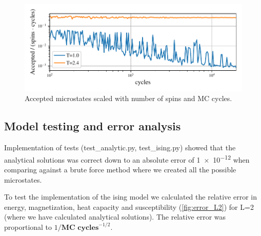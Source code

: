 \begin{figure}[H]
  \centering
  \includegraphics[width=\textwidth]{../figures/accepted.pdf}
  \caption{Accepted microstates scaled with number of spins and MC cycles.}
  \label{fig:accepted}
\end{figure}

\subsection{Model testing and error analysis}

Implementation of tests (test\_analytic.py, test\_ising.py) showed that the
analytical solutions was correct down to an absolute error of \num{1e-12}  when
comparing against a brute force method where we created all the possible
microstates.


To test the implementation of the ising model we calculated the relative error
in energy, magnetization, heat capacity and susceptibility (\cref{fig:error_L2})
for L=2 (where we have calculated analytical solutions). The relative error
was proportional to $1/ \textbf{MC cycles}^{-1/2}$.

